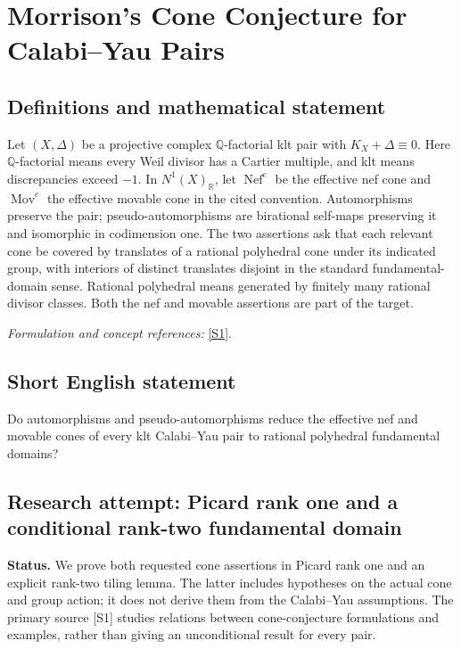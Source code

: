 \documentclass[11pt]{article}
\begin{document}
\section*{\texorpdfstring{Morrison’s Cone Conjecture for Calabi–Yau Pairs}{Morrison’s Cone Conjecture for Calabi–Yau Pairs}}\label{statement}
\subsection{Definitions and mathematical statement}
Let $(X,\Delta)$ be a projective complex ${\mathbb{Q}}$-factorial klt pair with $K_X+\Delta\equiv0$. Here ${\mathbb{Q}}$-factorial means every Weil divisor has a Cartier multiple, and klt means discrepancies exceed $-1$. In $N^1(X)_{{\mathbb{R}}}$, let $\operatorname{Nef}^e$ be the effective nef cone and $\operatorname{Mov}^e$ the effective movable cone in the cited convention. Automorphisms preserve the pair; pseudo-automorphisms are birational self-maps preserving it and isomorphic in codimension one. The two assertions ask that each relevant cone be covered by translates of a rational polyhedral cone under its indicated group, with interiors of distinct translates disjoint in the standard fundamental-domain sense. Rational polyhedral means generated by finitely many rational divisor classes. Both the nef and movable assertions are part of the target.
\par\smallskip\textit{Formulation and concept references:} \href{https://arxiv.org/abs/2406.07307}{[S1]}.

\subsection{Short English statement}
Do automorphisms and pseudo-automorphisms reduce the effective nef and movable cones of every klt Calabi–Yau pair to rational polyhedral fundamental domains?
\subsection{Research attempt: Picard rank one and a conditional rank-two fundamental domain}
\textbf{Status.} We prove both requested cone assertions in Picard rank one and an explicit rank-two tiling lemma. The latter includes hypotheses on the actual cone and group action; it does not derive them from the Calabi--Yau assumptions. The primary source [S1] studies relations between cone-conjecture formulations and examples, rather than giving an unconditional result for every pair.
\end{document}

